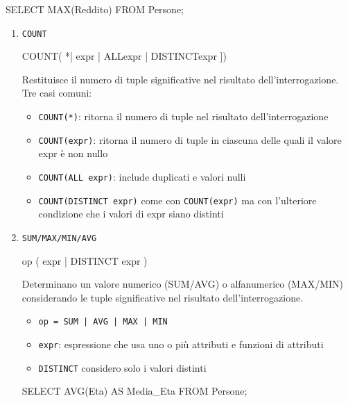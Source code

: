 \begin{codiceSQL}
SELECT MAX(Reddito) 
FROM Persone;
\end{codiceSQL}


\begin{enumerate}[itemsep=\medskipamount]
  \item \texttt{COUNT}
\begin{codiceSQL}
COUNT({ *| expr | ALLexpr | DISTINCTexpr }])
\end{codiceSQL}
  Restituisce il numero di tuple significative nel risultato dell’interrogazione.
  Tre casi comuni:\begin{itemize}[label=$\diamond$, itemsep=\smallskipamount]
    \item \texttt{COUNT(*)}: ritorna il numero di tuple nel risultato dell’interrogazione
    \item \texttt{COUNT(expr)}: ritorna il numero di tuple in ciascuna delle quali il valore expr è non nullo
    \item \texttt{COUNT(ALL expr)}: include duplicati e valori nulli
    \item \texttt{COUNT(DISTINCT expr)} come con \texttt{COUNT(expr)} ma con l’ulteriore condizione che i valori di expr siano distinti
  \end{itemize}
  \item \texttt{SUM/MAX/MIN/AVG} 
\begin{codiceSQL}
op ({ expr | DISTINCT expr })
\end{codiceSQL}
  Determinano un valore numerico (SUM/AVG) o alfanumerico (MAX/MIN) considerando le tuple significative nel risultato dell’interrogazione.
  \begin{itemize}[label=$\diamond$, itemsep=\smallskipamount]
    \item \texttt{op = SUM | AVG | MAX | MIN}
    \item \texttt{expr}: espressione che usa uno o più attributi e funzioni di attributi
    \item \texttt{DISTINCT} considero solo i valori distinti
  \end{itemize}
\begin{codiceSQL}
SELECT AVG(Eta) AS Media\_Eta
FROM Persone;
\end{codiceSQL}
\end{enumerate}


